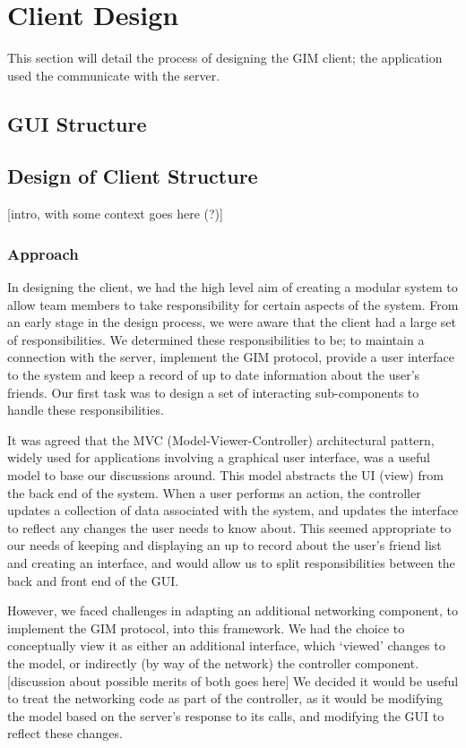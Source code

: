 \section{Client Design}

This section will detail the process of designing the GIM client; the application used the communicate with the server.

\subsection{GUI Structure}
\subsection{Design of Client Structure}

[intro, with some context goes here (?)]

\subsubsection{Approach}

In designing the client, we had the high level aim of creating a modular system to allow team members to take responsibility for certain aspects of the system. From an early stage in the design process, we were aware that the client had a large set of responsibilities. We determined these responsibilities to be;  to maintain a connection with the server, implement the GIM protocol, provide a user interface to the system and keep a record of up to date information about the user’s friends. Our first task was to design a set of interacting sub-components to handle these responsibilities.

It was agreed that the MVC (Model-Viewer-Controller) architectural pattern, widely used for applications involving a graphical user interface, was a useful model to base our discussions around. This model abstracts the UI (view) from the back end of the system. When a user performs an action, the controller updates a collection of data associated with the system, and updates the interface to reflect any changes the user needs to know about. This seemed appropriate to our needs of keeping and displaying an up to record about the user’s friend list and creating an interface, and would allow us to split responsibilities between the back and front end of the GUI. 

However, we faced challenges in adapting an additional networking component, to implement the GIM protocol, into this framework. We had the choice to conceptually view it as either an additional interface, which ‘viewed’ changes to the model, or indirectly (by way of the network) the controller component. [discussion about possible merits of both goes here] We decided it would be useful to treat the networking code as part of the controller, as it would be modifying the model based on the server’s response to its calls, and modifying the GUI to reflect these changes.
	
